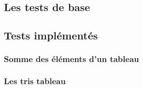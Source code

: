 \subsection{Les tests de base}
\subsection{Tests implémentés}
\subsubsection{Somme des éléments d'un tableau}
\subsubsection{Les tris tableau}
